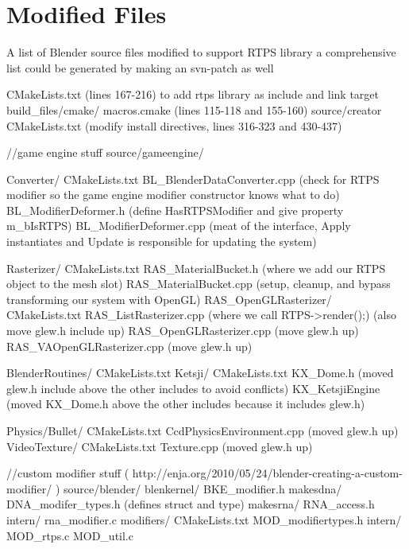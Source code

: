 

\section{Modified Files}
A list of Blender source files modified to support RTPS library
a comprehensive list could be generated by making an svn-patch as well

\begin{cppcode}{0}

CMakeLists.txt (lines 167-216) to add rtps library as include and link target
build_files/cmake/
    macros.cmake (lines 115-118 and 155-160)
source/creator
    CMakeLists.txt (modify install directives, lines 316-323 and 430-437)

//game engine stuff
source/gameengine/

    Converter/
        CMakeLists.txt
        BL_BlenderDataConverter.cpp (check for RTPS modifier so the game engine modifier constructor knows what to do)
        BL_ModifierDeformer.h (define HasRTPSModifier and give property m_bIsRTPS)
        BL_ModifierDeformer.cpp (meat of the interface, Apply instantiates and Update is responsible for updating the system)       
 
    Rasterizer/
        CMakeLists.txt
        RAS_MaterialBucket.h (where we add our RTPS object to the mesh slot)
        RAS_MaterialBucket.cpp (setup, cleanup, and bypass transforming our system with OpenGL)
        RAS_OpenGLRasterizer/
            CMakeLists.txt
            RAS_ListRasterizer.cpp (where we call RTPS->render();) (also move glew.h include up)
            RAS_OpenGLRasterizer.cpp (move glew.h up)
            RAS_VAOpenGLRasterizer.cpp (move glew.h up)

    BlenderRoutines/
        CMakeLists.txt
    Ketsji/
        CMakeLists.txt
        KX_Dome.h (moved glew.h include above the other includes to avoid conflicts)
        KX_KetsjiEngine (moved KX_Dome.h above the other includes because it includes glew.h)

    Physics/Bullet/
        CMakeLists.txt
        CcdPhysicsEnvironment.cpp (moved glew.h up) 
    VideoTexture/
        CMakeLists.txt 
        Texture.cpp (moved glew.h up)

//custom modifier stuff ( http://enja.org/2010/05/24/blender-creating-a-custom-modifier/ )
source/blender/
    blenkernel/
        BKE_modifier.h
    makesdna/
        DNA_modifer_types.h (defines struct and type)
    makesrna/
        RNA_access.h 
        intern/
            rna_modifier.c
    modifiers/
        CMakeLists.txt
        MOD_modifiertypes.h
        intern/
            MOD_rtps.c
            MOD_util.c
    

\end{cppcode}
